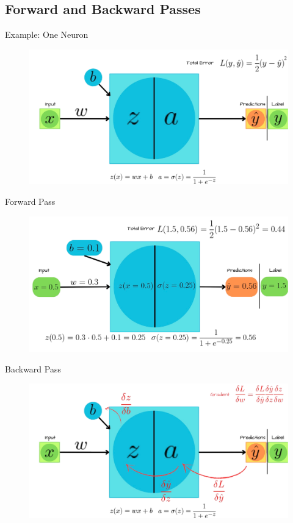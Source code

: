 \documentclass[serif, aspectratio=169]{beamer}
\begin{document}
\subsection{Forward and Backward Passes}
\begin{frame}{Example: One Neuron}
    \begin{figure}
        \vspace{-0.3cm}
        \includegraphics[width=.9\linewidth, height=\textheight, keepaspectratio]{pic/1.png}
    \end{figure}
\end{frame}

\begin{frame}{Forward Pass}
    \begin{figure}
        \vspace{-0.3cm}
        \includegraphics[width=.9\linewidth, height=\textheight, keepaspectratio]{pic/2.png}
    \end{figure}
\end{frame}

\begin{frame}{Backward Pass}
    \begin{figure}
        \vspace{-0.3cm}
        \includegraphics[width=.9\linewidth, height=\textheight, keepaspectratio]{pic/4.png}
    \end{figure}
\end{frame}
\end{document}

